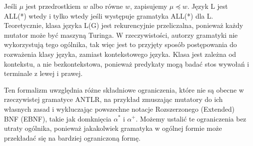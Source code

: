 Jeśli \(\mu\) jest przedrostkiem \(w\) albo równe \(w\), zapisujemy \(\mu \preceq w\).
Język L jest ALL(*) wtedy i tylko wtedy jeśli występuje gramatyka ALL(*) dla L.
Teoretycznie, klasa języka L(G) jest rekurencyjnie przeliczalna,
ponieważ każdy mutator może być maszyną Turinga.
W rzeczywistości, autorzy gramatyki nie wykorzystują tego ogólnika,
tak więc jest to przyjęty sposób postępowania do rozważenia klasy języka,
zamiast kontekstowego języka. Klasa jest zależna od kontekstu, a nie bezkontekstowa,
ponieważ predykaty mogą badać stos wywołań i terminale z lewej i prawej.
\par
Ten formalizm uwzględnia różne składniowe ograniczenia, które nie są obecne w rzeczywistej
gramatyce ANTLR, na przykład zmuszając mutatory do ich własnych zasad i wykluczając
powszechne notacje Rozszerzonego (Extended) BNF (EBNF),
takie jak domknięcia \(\alpha^*\) i \(\alpha^+\).
Możemy ustalić te ograniczenia bez utraty ogólnika, ponieważ jakakolwiek
gramatyka w ogólnej formie może przekładać się na bardziej ograniczoną formę. 

